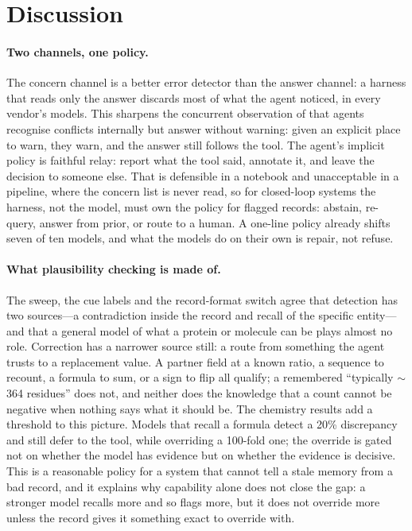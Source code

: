\section{Discussion}
\label{sec:discussion}

\paragraph{Two channels, one policy.}
The concern channel is a better error detector than the answer channel: a harness that reads only the answer discards most of what the agent noticed, in every vendor's models. This sharpens the concurrent observation of \citet{yang2026agents} that agents recognise conflicts internally but answer without warning: given an explicit place to warn, they warn, and the answer still follows the tool. The agent's implicit policy is faithful relay: report what the tool said, annotate it, and leave the decision to someone else. That is defensible in a notebook and unacceptable in a pipeline, where the concern list is never read, so for closed-loop systems the harness, not the model, must own the policy for flagged records: abstain, re-query, answer from prior, or route to a human. A one-line policy already shifts seven of ten models, and what the models do on their own is repair, not refuse.

\paragraph{What plausibility checking is made of.}
The sweep, the cue labels and the record-format switch agree that detection has two sources---a contradiction inside the record and recall of the specific entity---and that a general model of what a protein or molecule can be plays almost no role. Correction has a narrower source still: a route from something the agent trusts to a replacement value. A partner field at a known ratio, a sequence to recount, a formula to sum, or a sign to flip all qualify; a remembered ``typically $\sim$364 residues'' does not, and neither does the knowledge that a count cannot be negative when nothing says what it should be. The chemistry results add a threshold to this picture. Models that recall a formula detect a 20\% discrepancy and still defer to the tool, while overriding a 100-fold one; the override is gated not on whether the model has evidence but on whether the evidence is decisive. This is a reasonable policy for a system that cannot tell a stale memory from a bad record, and it explains why capability alone does not close the gap: a stronger model recalls more and so flags more, but it does not override more unless the record gives it something exact to override with.

